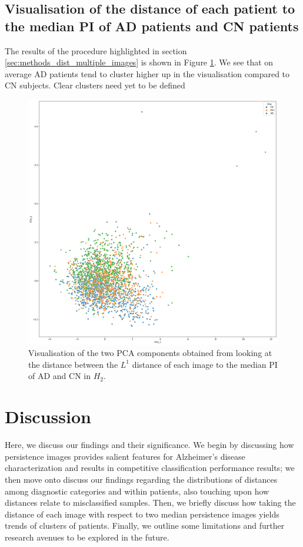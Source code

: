\documentclass{article}
\begin{document}
\subsection{Visualisation of the distance of each patient to the median PI of AD patients and CN patients}

The results of the procedure highlighted in section \ref{sec:methods_dist_multiple_images} is shown in Figure \ref{fig:vis_pca_ad_cn}. We see that on average AD patients tend to cluster higher up in the visualisation compared to CN subjects. Clear clusters need yet to be defined

\begin{figure}
  \centering
  \includegraphics[width=\textwidth]{figures/cluster_CN_H_2_AD_H_2_PCA.png}
  \caption{Visualisation of the two PCA components obtained from looking at the distance between the $L^1$ distance of each image to the median PI of AD and CN in $H_2$.}
  \label{fig:vis_pca_ad_cn}
\end{figure}

\section{Discussion}\label{sec:discussion}

Here, we discuss our findings and their significance. We begin by discussing how persistence images provides salient features for Alzheimer's disease characterization and results in competitive classification performance results; we then move onto discuss our findings regarding the distributions of distances among diagnostic categories and within patients, also touching upon how distances relate to misclassified samples. Then, we briefly discuss how taking the distance of each image with respect to two median persistence images yields trends of clusters of patients. Finally, we outline some limitations and further research avenues to be explored in the future.
\end{document}

